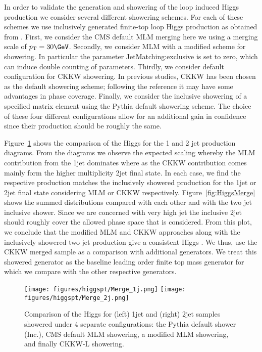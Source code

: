 In order to validate the generation and showering of the loop induced Higgs production we consider several different showering schemes. For each of these schemes we use inclusively generated finite-top loop Higgs production as obtained from \MCATNLO. First, we consider the CMS default MLM merging here we using a merging scale of $\pt=30\GeV$. Secondly, we consider MLM with a modified scheme for showering. In particular the parameter JetMatching:exclusive is set to zero, which can induce double counting of parameters. Thirdly, we consider default configuration for CKKW showering. In previous studies, CKKW has been chosen as the default showering scheme\cite{Buschmann:2014sia}; following the reference it may have some advantages in phase coverage.  Finally, we consider the inclusive showering of a specified matrix element using the Pythia default showering scheme. The choice of these four different configurations allow for an additional gain in confidence since their production should be roughly the same. 

Figure~\ref{fig:Higgs1j2j} shows the comparison of the Higgs \pt for the 1 and 2 jet production diagrams. From the diagrams we observe the expected scaling whereby the MLM contribution from the 1jet dominates where as the CKKW contribution comes mainly form the higher multiplicity 2jet final state. In each case, we find the respective production matches the inclusively showered production for the 1jet or 2jet final state considering MLM or CKKW respectively. Figure~\ref{fig:HiggsMerge} shows the summed \pt distributions compared with each other and with the two jet inclusive shower. Since we are concerned with very high jet \pt the inclusive 2jet should roughly cover the allowed phase space that is considered. From this plot, we conclude that the modified MLM and CKKW approaches along with the inclusively showered two jet production give a consistent Higgs \pt. We thus, use the CKKW merged sample as a comparison with additional generators. We treat this showered generator as the baseline leading order finite top mass generator for which we compare with the other respective generators.  

\begin{figure}[hbtp]\begin{center}
    \texttt{[image: figures/higgspt/Merge\_1j.png]}
    \texttt{[image: figures/higgspt/Merge\_2j.png]} \\
    \caption{Comparison of the Higgs \pt for (left) 1jet and (right) 2jet samples showered under 4 separate configurations: the Pythia default shower (Inc.), CMS default MLM showering, a modified MLM showering, and finally CKKW-L showering.} 
 \label{fig:Higgs1j2j}
 \end{center}
 \end{figure}

